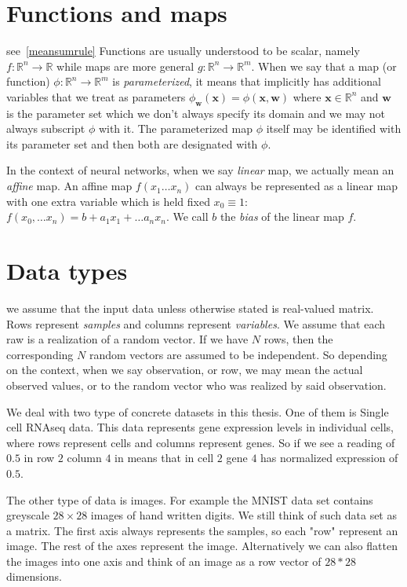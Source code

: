 \documentclass[11pt, a4paper]{report}
\theoremstyle{plain}
\theoremstyle{definition}
\theoremstyle{remark}
\newcommand{\R}{\mathbb{R}}
\newcommand{\x}{\mathbf{x}}
\newcommand{\w}{\mathbf{w}}
\begin{document}
\section{Functions and maps}
see~\ref{meansumrule}
Functions are usually understood to be scalar, namely $f:\R^n \to \R$ while maps
are more general $g:\R^n \to \R^m$. When we say that a map (or function) $\phi
:\R^n \to \R^m$ is \emph{parameterized}, it means that implicitly has additional 
variables that we treat as parameters $\phi_{\w}(\x) = \phi(\x, \w)$ where $\x \in \R^n$
and $\w$ is the parameter set which we don't always specify its domain and we may not
always subscript $\phi$ with it. The parameterized map $\phi$ itself may be
identified with its parameter set and then both are designated with $\phi$.

In the context of neural networks, when we say \emph{linear} map, we actually mean an
\emph{affine} map.
An affine map $f(x_1 \dots x_n)$ can always be represented as a linear map with one extra variable 
which is held fixed $x_0 \equiv 1$: $f(x_0, \dots x_n) = b + a_1 x_1 + \dots a_n
x_n$. We call $b$ the \emph{bias} of the linear map $f$.
\label{affinelinear}

\section{Data types}
we assume that the input data unless otherwise stated is real-valued matrix.
Rows represent \emph{samples} and columns represent \emph{variables}. We assume
that each raw is a realization of a random vector. If we have $N$ rows, then the
corresponding $N$ random vectors are assumed to be independent. So depending on
the context, when we say observation, or row, we may mean the actual observed
values, or to the random vector who was realized by said observation.

We deal with two type of concrete datasets in this thesis. One of them is
Single cell RNAseq data. This data represents gene expression levels in 
individual cells, where rows represent cells and columns represent genes.
So if we see a reading of
$0.5$ in row $2$ column $4$ in means that in cell $2$ gene $4$ has normalized
expression of $0.5$.

The other type of data is images. For example the MNIST data set contains 
greyscale $28 \times 28$ images of hand written digits.
We still think of such data set as a matrix. The first axis always represents
the samples, so each "row" represent an image. The rest of the axes represent
the image. Alternatively we can also flatten the images into one axis and think
of an image as a row vector of $28*28$ dimensions.
\end{document}
